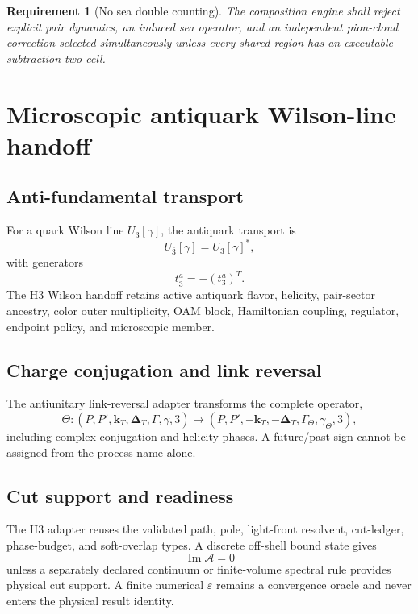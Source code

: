 \documentclass[11pt]{article}
\newtheorem{requirement}[definition]{Requirement}
\newcommand{\kT}{\bm{k}_{T}}
\newcommand{\DT}{\bm{\Delta}_{T}}
\newcommand{\cA}{\mathcal A}
\newcommand{\eps}{\varepsilon}
\begin{document}
\begin{requirement}[No sea double counting]
The composition engine shall reject explicit pair dynamics, an induced sea
operator, and an independent pion-cloud correction selected simultaneously
unless every shared region has an executable subtraction two-cell.
\end{requirement}

\section{Microscopic antiquark Wilson-line handoff}
\label{sec:wilson}

\subsection{Anti-fundamental transport}

For a quark Wilson line \(U_3[\gamma]\), the antiquark transport is
\begin{equation}
 U_{\bar3}[\gamma]
 =U_3[\gamma]^*,
\end{equation}
with generators
\begin{equation}
 t_{\bar3}^a=-\left(t_3^a\right)^T.
\end{equation}
The H3 Wilson handoff retains active antiquark flavor, helicity, pair-sector
ancestry, color outer multiplicity, OAM block, Hamiltonian coupling,
regulator, endpoint policy, and microscopic member.

\subsection{Charge conjugation and link reversal}

The antiunitary link-reversal adapter transforms the complete operator,
\begin{equation}
 \Theta:
 \left(
 P,P',\kT,\DT,\Gamma,\gamma,\bar3
 \right)
 \longmapsto
 \left(
 \bar P,\bar P',-\kT,-\DT,
 \Gamma_{\Theta},\gamma_{\Theta},\bar3
 \right),
\end{equation}
including complex conjugation and helicity phases.  A future/past sign cannot
be assigned from the process name alone.

\subsection{Cut support and readiness}

The H3 adapter reuses the validated path, pole, light-front resolvent,
cut-ledger, phase-budget, and soft-overlap types.  A discrete off-shell bound
state gives
\begin{equation}
 \operatorname{Im}\cA=0
\end{equation}
unless a separately declared continuum or finite-volume spectral rule
provides physical cut support.  A finite numerical \(\eps\) remains a
convergence oracle and never enters the physical result identity.
\end{document}
